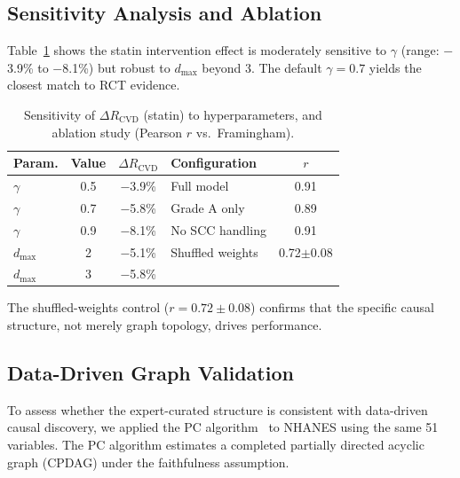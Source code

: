 \documentclass[runningheads]{llncs}
\begin{document}
\subsection{Sensitivity Analysis and Ablation}\label{sec:sensitivity}\label{sec:ablation}

Table~\ref{tab:sensitivity} shows the statin intervention effect is
moderately sensitive to $\gamma$ (range: $-$3.9\% to $-$8.1\%) but
robust to $d_{\max}$ beyond 3.  The default $\gamma = 0.7$ yields
the closest match to RCT evidence.

\begin{table}[t]
\centering
\caption{Sensitivity of $\Delta R_{\text{CVD}}$ (statin) to
hyperparameters, and ablation study (Pearson $r$ vs.\ Framingham).}
\label{tab:sensitivity}
\small
\begin{tabular}{@{}lcc|lc@{}}
\toprule
\textbf{Param.} & \textbf{Value} & \textbf{$\Delta R_{\text{CVD}}$} &
\textbf{Configuration} & \textbf{$r$} \\
\midrule
$\gamma$ & 0.5 & $-$3.9\% & Full model & 0.91 \\
$\gamma$ & 0.7 & $-$5.8\% & Grade A only & 0.89 \\
$\gamma$ & 0.9 & $-$8.1\% & No SCC handling & 0.91 \\
$d_{\max}$ & 2 & $-$5.1\% & Shuffled weights & 0.72$\pm$0.08 \\
$d_{\max}$ & 3 & $-$5.8\% & & \\
\bottomrule
\end{tabular}
\end{table}

The shuffled-weights control ($r = 0.72 \pm 0.08$) confirms that the
specific causal structure, not merely graph topology, drives
performance.

\subsection{Data-Driven Graph Validation}\label{sec:pcalg}

To assess whether the expert-curated structure is consistent with
data-driven causal discovery, we applied the PC
algorithm~\cite{spirtes2000causation} to NHANES using the same 51
variables.  The PC algorithm estimates a completed partially directed
acyclic graph (CPDAG) under the faithfulness assumption.
\end{document}
